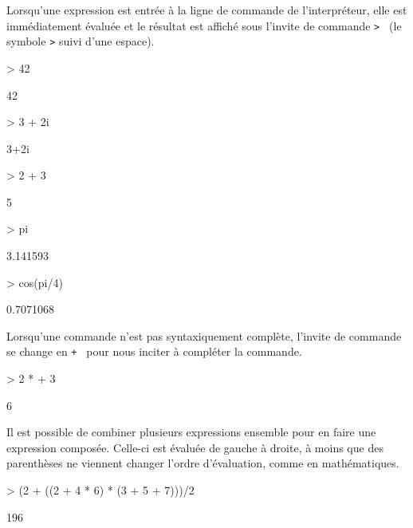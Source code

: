 Lorsqu'une expression est entrée à la ligne de commande de
l'interpréteur, elle est immédiatement évaluée et le résultat est
affiché sous l'invite de commande \verb*|> | (le symbole \verb|>|
suivi d'une espace).
\begin{Schunk}
\begin{Sinput}
> 42
\end{Sinput}
\begin{Soutput}
[1] 42
\end{Soutput}
\begin{Sinput}
> 3 + 2i
\end{Sinput}
\begin{Soutput}
[1] 3+2i
\end{Soutput}
\begin{Sinput}
> 2 + 3
\end{Sinput}
\begin{Soutput}
[1] 5
\end{Soutput}
\begin{Sinput}
> pi
\end{Sinput}
\begin{Soutput}
[1] 3.141593
\end{Soutput}
\begin{Sinput}
> cos(pi/4)
\end{Sinput}
\begin{Soutput}
[1] 0.7071068
\end{Soutput}
\end{Schunk}

Lorsqu'une commande n'est pas syntaxiquement complète, l'invite de
commande se change en \verb*|+ | pour nous inciter à compléter la
commande.
\begin{Schunk}
\begin{Sinput}
> 2 *
+ 3
\end{Sinput}
\begin{Soutput}
[1] 6
\end{Soutput}
\end{Schunk}

Il est possible de combiner plusieurs expressions ensemble pour en
faire une expression composée. Celle-ci est évaluée de gauche à
droite, à moins que des parenthèses ne viennent changer l'ordre
d'évaluation, comme en mathématiques.
\begin{Schunk}
\begin{Sinput}
> (2 + ((2 + 4 * 6) * (3 + 5 + 7)))/2
\end{Sinput}
\begin{Soutput}
[1] 196
\end{Soutput}
\end{Schunk}


